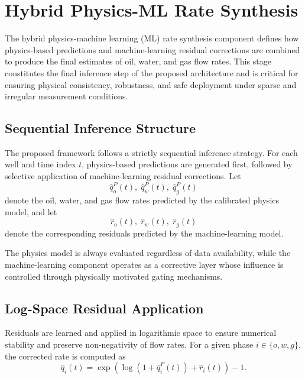 \documentclass[12pt,APA]{uomthesis}
\begin{document}
\section{Hybrid Physics-ML Rate Synthesis}
\label{sec:hybrid-rate-synthesis}
The hybrid physics-machine learning (ML) rate synthesis component defines how
physics-based predictions and machine-learning residual corrections are combined
to produce the final estimates of oil, water, and gas flow rates. This stage
constitutes the final inference step of the proposed architecture and is critical
for ensuring physical consistency, robustness, and safe deployment under sparse
and irregular measurement conditions.

\subsection{Sequential Inference Structure}
The proposed framework follows a strictly sequential inference strategy. For each
well and time index $t$, physics-based predictions are generated first, followed by
selective application of machine-learning residual corrections. Let
\begin{equation}
\hat{q}_o^{P}(t), \; \hat{q}_w^{P}(t), \; \hat{q}_g^{P}(t)
\end{equation}
denote the oil, water, and gas flow rates predicted by the calibrated physics model,
and let
\begin{equation}
\hat{r}_o(t), \; \hat{r}_w(t), \; \hat{r}_g(t)
\end{equation}
denote the corresponding residuals predicted by the machine-learning model.

The physics model is always evaluated regardless of data availability, while the
machine-learning component operates as a corrective layer whose influence is
controlled through physically motivated gating mechanisms.

\subsection{Log-Space Residual Application}
Residuals are learned and applied in logarithmic space to ensure numerical stability
and preserve non-negativity of flow rates. For a given phase $i \in \{o, w, g\}$,
the corrected rate is computed as
\begin{equation}
\hat{q}_i(t)
=
\exp\!\left(
\log\!\left(1 + \hat{q}_i^{P}(t)\right) + \hat{r}_i(t)
\right) - 1.
\end{equation}
\end{document}
